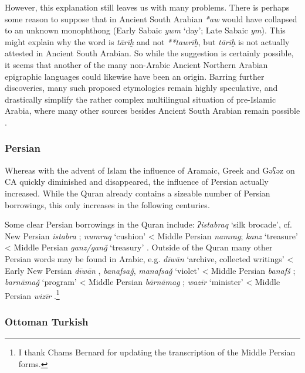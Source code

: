 \documentclass[output=paper]{langsci/langscibook}
\begin{document}
However, this explanation still leaves us with many problems. There is perhaps some reason to suppose that in Ancient South Arabian \textit{*aw} would have collapsed to an unknown monophthong (Early Sabaic \textit{ywm} ‘day’; Late Sabaic \textit{ym}). This might explain why the word is \textit{tārīḫ} and not \textit{**tawrīḫ}, but \textit{tārīḫ} is not actually attested in Ancient South Arabian. So while the suggestion is certainly possible, it seems that another of the many non-Arabic Ancient Northern Arabian epigraphic languages could likewise have been an origin. Barring further discoveries, many such proposed etymologies remain highly speculative, and drastically simplify the rather complex multilingual situation of pre-Islamic Arabia, where many other sources besides Ancient South Arabian remain possible \citep{Al-Jallad2018ANA}.

\subsubsection{\label{bkm:Ref13224492}Persian}

Whereas with the advent of Islam the influence of Aramaic, Greek and Gəʕəz on CA quickly diminished and disappeared, the influence of Persian actually increased. While the Quran already contains a sizeable number of Persian borrowings, this only increases in the following centuries.

Some clear Persian borrowings in the Quran include: \textit{ʔistabraq} `silk brocade', cf. New Persian \textit{istabra} \citep[204]{Eilers1962}; \textit{numruq} `cushion' < Middle Persian \textit{namrag}; \textit{kanz} ‘treasure’ < Middle Persian \textit{ganz/ganǧ} ‘treasury’ \citep[206]{Eilers1962}. Outside of the Quran many other Persian words may be found in Arabic, e.g. \textit{dīwān} ‘archive, collected writings’ < Early New Persian \textit{dīwān} \citep[223]{Eilers1962}, \textit{banafsaǧ}, \textit{manafsaǧ} ‘violet’ < Middle Persian \textit{banafš} \citep[596]{Eilers1971}; \textit{barnāmaǧ} ‘program’ < Middle Persian \textit{bārnāmag} \citep[217-218]{Eilers1962}; \textit{wazīr} ‘minister’ < Middle Persian \textit{wizīr} \citep[207]{Eilers1962}.\footnote{I thank Chams Bernard for updating the transcription of the Middle Persian forms.}

\subsubsection{\label{bkm:Ref13483797}Ottoman Turkish}
\end{document}

